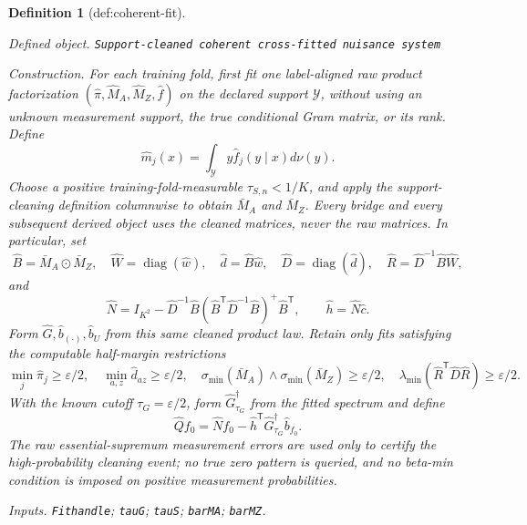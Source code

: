 \documentclass{article}
\newtheorem{definition}{Definition}
\begin{document}
\begin{definition}[def:coherent-fit]\label{def:coherent-fit}
\par\smallskip\noindent\emph{Defined object.} \texttt{Support-\allowbreak{}cleaned coherent cross-\allowbreak{}fitted nuisance system}
\par\smallskip\noindent\emph{Construction.} For each training fold, first fit one label-aligned raw product factorization \((\widehat\pi,\widehat M_A,\widehat M_Z,\widehat f)\) on the declared support \(\mathcal Y\), without using an unknown measurement support, the true conditional Gram matrix, or its rank.  Define
\[
 \widehat m_j(x)=\int_{\mathcal Y}y\widehat f_j(y\mid x)d\nu(y).
\]
Choose a positive training-fold-measurable \(\tau_{S,n}<1/K\), and apply the support-cleaning definition columnwise to obtain \(\bar M_A\) and \(\bar M_Z\).  Every bridge and every subsequent derived object uses the cleaned matrices, never the raw matrices.  In particular, set
\[
 \widehat B=\bar M_A\odot\bar M_Z,
 \quad \widehat W=\operatorname{diag}(\widehat w),
 \quad \widehat d=\widehat B\widehat w,
 \quad \widehat D=\operatorname{diag}(\widehat d),
 \quad \widehat R=\widehat D^{-1}\widehat B\widehat W,
\]
and
\[
 \widehat N=I_{K^2}-\widehat D^{-1}\widehat B
 (\widehat B^{\mathsf T}\widehat D^{-1}\widehat B)^+
 \widehat B^{\mathsf T},
 \qquad \widehat h=\widehat N\widehat c.
\]
Form \(\widehat G,\widehat b_{(\cdot)},\widehat b_U\) from this same cleaned product law.  Retain only fits satisfying the computable half-margin restrictions
\[
 \min_j\widehat\pi_j\geq\varepsilon/2,
 \quad \min_{a,z}\widehat d_{az}\geq\varepsilon/2,
 \quad \sigma_{\min}(\bar M_A)\wedge\sigma_{\min}(\bar M_Z)\geq\varepsilon/2,
 \quad \lambda_{\min}(\widehat R^{\mathsf T}\widehat D\widehat R)\geq\varepsilon/2.
\]
With the known cutoff \(\tau_G=\varepsilon/2\), form \(\widehat G_{\tau_G}^{\dagger}\) from the fitted spectrum and define
\[
 \widehat Qf_0=\widehat Nf_0-
 \widehat h^{\mathsf T}\widehat G_{\tau_G}^{\dagger}\widehat b_{f_0}.
\]
The raw essential-supremum measurement errors are used only to certify the high-probability cleaning event; no true zero pattern is queried, and no beta-min condition is imposed on positive measurement probabilities.
\par\smallskip\noindent\emph{Inputs.} \texttt{Fithandle}; \texttt{tauG}; \texttt{tauS}; \texttt{barMA}; \texttt{barMZ}.
\end{definition}
\end{document}
